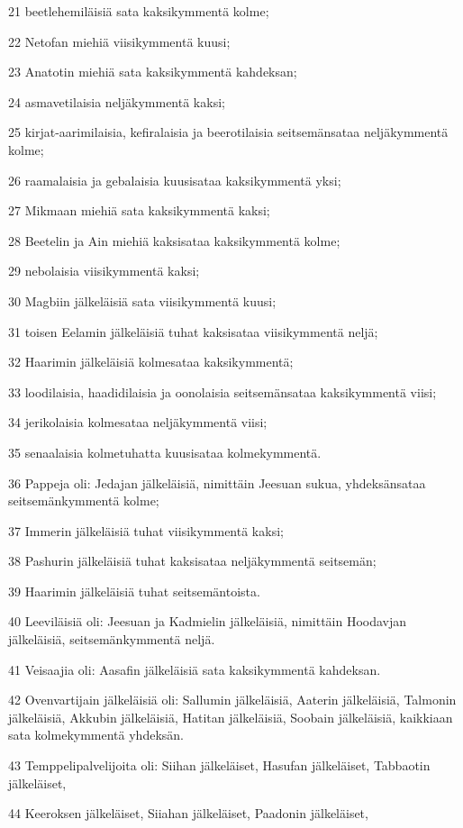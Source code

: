 \par 21 beetlehemiläisiä sata kaksikymmentä kolme;
\par 22 Netofan miehiä viisikymmentä kuusi;
\par 23 Anatotin miehiä sata kaksikymmentä kahdeksan;
\par 24 asmavetilaisia neljäkymmentä kaksi;
\par 25 kirjat-aarimilaisia, kefiralaisia ja beerotilaisia seitsemänsataa neljäkymmentä kolme;
\par 26 raamalaisia ja gebalaisia kuusisataa kaksikymmentä yksi;
\par 27 Mikmaan miehiä sata kaksikymmentä kaksi;
\par 28 Beetelin ja Ain miehiä kaksisataa kaksikymmentä kolme;
\par 29 nebolaisia viisikymmentä kaksi;
\par 30 Magbiin jälkeläisiä sata viisikymmentä kuusi;
\par 31 toisen Eelamin jälkeläisiä tuhat kaksisataa viisikymmentä neljä;
\par 32 Haarimin jälkeläisiä kolmesataa kaksikymmentä;
\par 33 loodilaisia, haadidilaisia ja oonolaisia seitsemänsataa kaksikymmentä viisi;
\par 34 jerikolaisia kolmesataa neljäkymmentä viisi;
\par 35 senaalaisia kolmetuhatta kuusisataa kolmekymmentä.
\par 36 Pappeja oli: Jedajan jälkeläisiä, nimittäin Jeesuan sukua, yhdeksänsataa seitsemänkymmentä kolme;
\par 37 Immerin jälkeläisiä tuhat viisikymmentä kaksi;
\par 38 Pashurin jälkeläisiä tuhat kaksisataa neljäkymmentä seitsemän;
\par 39 Haarimin jälkeläisiä tuhat seitsemäntoista.
\par 40 Leeviläisiä oli: Jeesuan ja Kadmielin jälkeläisiä, nimittäin Hoodavjan jälkeläisiä, seitsemänkymmentä neljä.
\par 41 Veisaajia oli: Aasafin jälkeläisiä sata kaksikymmentä kahdeksan.
\par 42 Ovenvartijain jälkeläisiä oli: Sallumin jälkeläisiä, Aaterin jälkeläisiä, Talmonin jälkeläisiä, Akkubin jälkeläisiä, Hatitan jälkeläisiä, Soobain jälkeläisiä, kaikkiaan sata kolmekymmentä yhdeksän.
\par 43 Temppelipalvelijoita oli: Siihan jälkeläiset, Hasufan jälkeläiset, Tabbaotin jälkeläiset,
\par 44 Keeroksen jälkeläiset, Siiahan jälkeläiset, Paadonin jälkeläiset,
